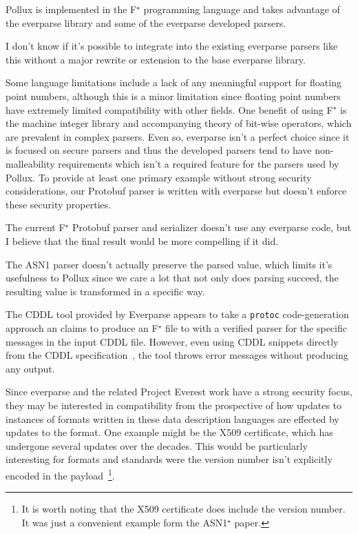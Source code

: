 \documentclass[11pt]{article}
\newcommand{\fstar}{F$^\star$}
\begin{document}
Pollux is implemented in the \fstar{} programming language and takes advantage
of the everparse library and some of the everparse developed parsers.  

\begin{risk}
  I don't know if it's possible to integrate into the existing everparse parsers
  like this without a major rewrite or extension to the base everparse library.
\end{risk}

Some language limitations include a lack of any meaningful support for floating
point numbers, although this is a minor limitation since floating point numbers
have extremely limited compatibility with other fields. One benefit of using
\fstar{} is the machine integer library and accompanying theory of bit-wise
operators, which are prevalent in complex parsers. Even so, everparse isn't a
perfect choice since it is focused on secure parsers and thus the developed
parsers tend to have non-malleability requirements which isn't a required
feature for the parsers used by Pollux. To provide at least one primary example
without strong security considerations, our Protobuf parser is written with
everparse but doesn't enforce these security properties.

\begin{info}
  The current \fstar{} Protobuf parser and serializer doesn't use any everparse
  code, but I believe that the final result would be more compelling if it did.
\end{info}

\begin{risk}
  The ASN1 parser doesn't actually preserve the parsed value, which limits it's
  usefulness to Pollux since we care a lot that not only does parsing succeed,
  the resulting value is transformed in a specific way.

  \tcblower{}

  The CDDL tool provided by Everparse appears to take a \texttt{protoc}
  code-generation approach an claims to produce an \fstar{} file to with a
  verified parser for the specific messages in the input CDDL file. However,
  even using CDDL snippets directly from the CDDL
  specification~\cite{birkholzConciseDataDefinition2019}, the tool throws error
  messages without producing any output.
\end{risk}

Since everparse and the related Project Everest work have a strong security
focus, they may be interested in compatibility from the prospective of how
updates to instances of formats written in these data description languages are
effected by updates to the format. One example might be the X509 certificate,
which has undergone several updates over the decades. This would be particularly
interesting for formats and standards were the version number isn't explicitly
encoded in the payload~\footnote{It is worth noting that the X509 certificate
  does include the version number. It was just a convenient example form the
  ASN1$^{\star}$ paper.}. 
\end{document}
